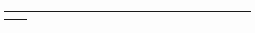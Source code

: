 \begin{titlepage}
{	\vspace{0.1in}
	\hrule
	\vspace{0.1in}
	
	\Huge \docTitle
	
	\vspace{0.04in}
	\hrule
	\vspace{0.4in}
	
	\large \teamnumber
	
	\vspace{0.1in}
}

\begin{minipage}[c]{\linewidth}
			\large
			\centering
			\begin{tabular}{l c c}
				\studentAname & \studentAmid & \studentAsid \\
				\studentBname & \studentBmid & \studentBsid \\
				\studentCname & \studentCmid & \studentCsid \\
			\end{tabular}
\end{minipage}


%		
%

\revisionTable

\end{titlepage}
